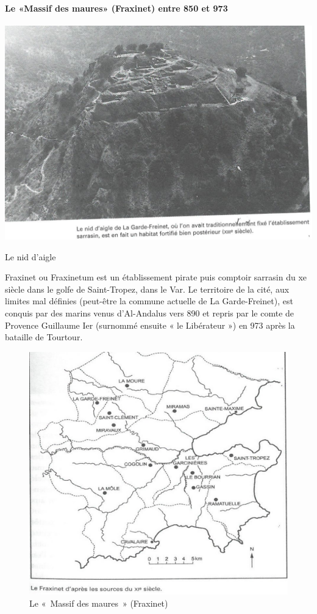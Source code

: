 \paragraph{Le «Massif des maures» (Fraxinet) entre 850 et 973}
 
 \begin{marginfigure}
    \centering
    \includegraphics[width=\textwidth]{Images/nidAigle.png}
    \caption{Le nid d'aigle}
    \label{fig:nidAigle}
\end{marginfigure}

 Fraxinet ou Fraxinetum est un établissement pirate puis comptoir  sarrasin du xe siècle dans le golfe de Saint-Tropez, dans le Var. Le territoire de la cité, aux limites mal définies (peut-être la commune actuelle de La Garde-Freinet), est conquis par des marins venus d'Al-Andalus vers 890 et repris par le comte de Provence Guillaume Ier (surnommé ensuite « le Libérateur ») en 973 après la bataille de Tourtour.
 

\begin{figure}[h!]
    \centering
    \includegraphics[width=\textwidth]{Images/Fraxinet.png}
    \caption{Le « Massif des maures » (Fraxinet) }
    \label{fig:Fraxinet}
\end{figure}

